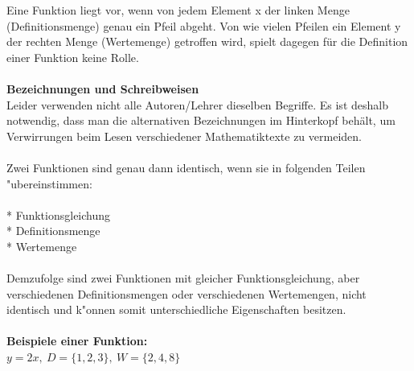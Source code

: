 \documentclass[10pt]{book}
\begin{document}
Eine Funktion liegt vor, wenn von jedem Element x der linken Menge (Definitionsmenge)
genau ein Pfeil abgeht.
Von wie vielen Pfeilen ein Element y der rechten Menge (Wertemenge)
getroffen wird, spielt dagegen für die Definition einer Funktion keine Rolle. \\
\\
\textbf{Bezeichnungen und Schreibweisen}
\\
Leider verwenden nicht alle Autoren/Lehrer dieselben Begriffe.
Es ist deshalb notwendig, dass man die alternativen Bezeichnungen
im Hinterkopf behält, um Verwirrungen beim Lesen verschiedener Mathematiktexte
zu vermeiden. \\
\\
Zwei Funktionen sind genau dann identisch, wenn sie in folgenden Teilen "ubereinstimmen:\\
\\
* Funktionsgleichung \\
* Definitionsmenge \\
* Wertemenge \\
\\
Demzufolge sind zwei Funktionen mit gleicher Funktionsgleichung, aber verschiedenen Definitionsmengen
oder verschiedenen Wertemengen, nicht identisch und k"onnen somit unterschiedliche Eigenschaften besitzen. \\
\\
\textbf{Beispiele einer Funktion:} \\
$ y = 2x , \: D = \{ 1, 2, 3 \} , \: W = \{ 2, 4, 8 \} $ \\



\end{document}
